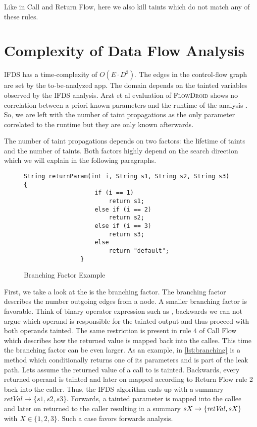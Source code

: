 \documentclass[../draft.tex]{subfiles}
\begin{document}
    Like in Call and Return Flow, here we also kill taints which do not match any of these rules.
    
    \section{Complexity of Data Flow Analysis}\label{s:complexity}
    IFDS has a time-complexity of $O(E \cdot D^3)$. The edges in the control-flow graph are set by the to-be-analyzed app. The domain depends on the tainted variables observed by the IFDS analysis. Arzt et al evaluation of \textsc{FlowDroid} shows no correlation between a-priori known parameters and the runtime of the analysis \cite{Arzt2017PhD}. So, we are left with the number of taint propagations as the only parameter correlated to the runtime but they are only known afterwards. 

    The number of taint propagations depends on two factors: the lifetime of taints and the number of taints. Both factors highly depend on the search direction which we will explain in the following paragraphs.

    \begin{figure}[ht]
        \centering
        \begin{adjustbox}{max width=\textwidth}
            \begin{lstlisting}[gobble=16]
                String returnParam(int i, String s1, String s2, String s3) {
                    if (i == 1)
                        return s1;
                    else if (i == 2)
                        return s2;
                    else if (i == 3)
                        return s3;
                    else
                        return "default";
                }
            \end{lstlisting}    
        \end{adjustbox}
        \caption{Branching Factor Example}
        \label{lst:branching}
    \end{figure}

    First, we take a look at the is the branching factor. The branching factor describes the number outgoing edges from a node. A smaller branching factor is favorable.   
    Think of binary operator expression such as , backwards we can not argue which operand is responsible for the tainted output and thus proceed with both operands tainted. The same restriction is present in rule 4 of Call Flow which describes how the returned value is mapped back into the callee. This time the branching factor can be even larger. As an example, in \autoref{lst:branching} is a method which conditionally returns one of its parameters and is part of the leak path. Lets assume the returned value of a call to  is tainted. Backwards, every returned operand is tainted and later on mapped according to Return Flow rule 2 back into the caller. Thus, the IFDS algorithm ends up with a summary $\mathit{retVal} \rightarrow \{s1, s2, s3\}$. Forwards, a tainted parameter is mapped into the callee and later on returned to the caller resulting in a summary $sX \rightarrow \mathit\{\mathit{retVal}, sX\}$ with $X \in \{1,2,3\}$. Such a case favors forwards analysis.
\end{document}
